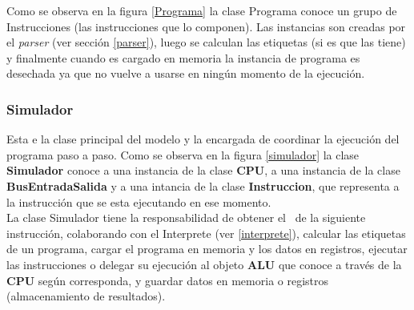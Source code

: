Como se observa en la figura \ref{Programa} la clase Programa conoce un grupo de Instrucciones (las instrucciones que lo componen). Las instancias son creadas por el \textit{parser} (ver sección \ref{parser}), luego se calculan las etiquetas (si es que las tiene) y finalmente cuando es cargado en memoria la instancia de programa es desechada ya que no vuelve a usarse en ningún momento de la ejecución.


\subsubsection{Simulador}

Esta e la clase principal del modelo y la encargada de coordinar la ejecución del programa paso a paso. Como se observa en la figura \ref{simulador} la clase \textbf{Simulador} conoce a una instancia de la clase \textbf{CPU}, a una instancia de la clase \textbf{BusEntradaSalida} y a una intancia de la clase \textbf{Instruccion}, que representa a la instrucción que se esta ejecutando en ese momento.\\

La clase Simulador tiene la responsabilidad de obtener el \codmaq\ de la siguiente instrucción, colaborando con el Interprete (ver \ref{interprete}), calcular las etiquetas de un programa, cargar el programa en memoria y los datos en registros,  ejecutar las instrucciones o delegar su ejecución al objeto \textbf{ALU} que conoce a través de la \textbf{CPU} según corresponda, y guardar datos en memoria o registros (almacenamiento de resultados).







